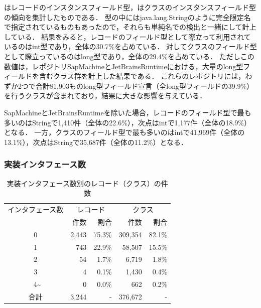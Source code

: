 はレコードのインスタンスフィールド型，はクラスのインスタンスフィールド型の傾向を集計したものである．
型の中にはjava.lang.Stringのように完全限定名で指定されているものもあったので，それらも単純名での検出と一緒にして計上している．
結果をみると，レコードのフィールド型として際立って利用されているのはint型であり，全体の30.7\%を占めている．
対してクラスのフィールド型として際立っているのはlong型であり，全体の29.4\%を占めている．
ただしこの数値は，レポジトリSapMachineとJetBrainsRuntimeにおける，大量のlong型フィールドを含むクラス群を計上した結果である．
これらのレポジトリには，わずか2つで合計81,903ものlong型フィールド宣言（全long型フィールドの39.9\%）を行うクラスが含まれており，結果に大きな影響を与えている．

SapMachineとJetBrainsRuntimeを除いた場合，レコードのフィールド型で最も多いのはStringで1,410件（全体の22.6\%），次点はintで1,177件（全体の18.9\%）となる．
一方，クラスのフィールド型で最も多いのはintで41,969件（全体の13.1\%），次点はStringで35,687件（全体の11.2\%）となる．



\subsubsection{実装インタフェース数\label{num_implemented_interfaces}}

\begin{table}[t]
    \caption{実装インタフェース数別のレコード（クラス）の件数}
    \label{num_interfaces}
    \centering
    \begin{tabular}{c||r|r|r|r}
        \hline
        インタフェース数 & \multicolumn{2}{c|}{レコード} & \multicolumn{2}{c}{クラス}\\
         & 件数 & 割合 & 件数 & 割合\\
        \hline\hline
        0 & 2,443 & 75.3\% & 309,354 & 82.1\%\\
        1 & 743 & 22.9\% & 58,507 & 15.5\%\\
        2 & 54 & 1.7\% & 6,719 & 1.8\%\\
        3 & 4 & 0.1\% & 1,430 & 0.4\%\\\
        4\textasciitilde & 0 & 0.0\% & 662 & 0.2\%\\
        \hline
        合計 & 3,244 & - & 376,672 & - \\
        \hline
    \end{tabular}
\end{table}

